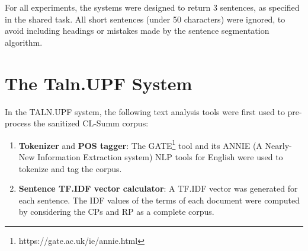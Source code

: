 \documentclass[11pt]{article}
\begin{document}
For all experiments, the systems were designed to return 3 sentences, as specified 
in the shared task. All short sentences (under 50 characters) were ignored, to 
avoid including headings or mistakes made by the sentence segmentation algorithm.


\section{The Taln.UPF System}

In the TALN.UPF system, the following text analysis tools were first used to pre-process the sanitized CL-Summ corpus:
\begin{enumerate}
\item \textbf{Tokenizer} and \textbf{POS tagger}: The GATE\footnote{https://gate.ac.uk/ie/annie.html} tool and its 
ANNIE (A Nearly-New Information Extraction system) NLP tools for English were used to tokenize and tag the corpus.
\vspace{-.3cm}
\item \textbf{Sentence TF.IDF vector calculator}: A TF.IDF vector was generated for each sentence. The IDF values of the terms of each document were computed by considering the CPs and RP as a complete corpus.
\vspace{-.3cm}
\end{enumerate}
\end{document}
